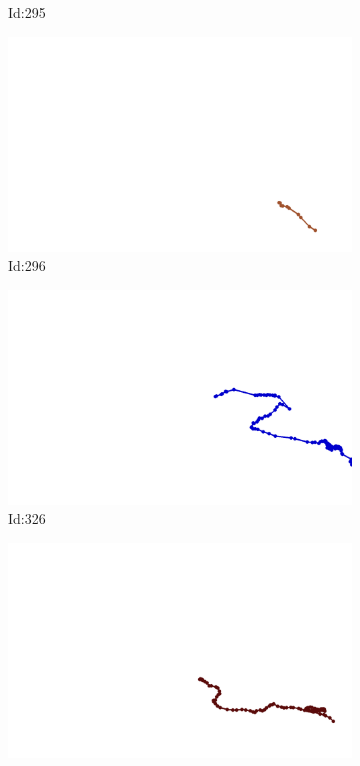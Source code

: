 \documentclass[12pt,twoside]{report}
\begin{document}
\begin{figure}
\begin{subfigure}[b]{0.20\textwidth}
\caption{Id:295}
\end{subfigure}
\begin{subfigure}[b]{0.20\textwidth}
\centering
\includegraphics[width=\textwidth]{../trajectories/296.png}
\caption{Id:296}
\end{subfigure}
\begin{subfigure}[b]{0.20\textwidth}
\centering
\includegraphics[width=\textwidth]{../trajectories/326.png}
\caption{Id:326}
\end{subfigure}
\begin{subfigure}[b]{0.20\textwidth}
\centering
\includegraphics[width=\textwidth]{../trajectories/460.png}

\end{subfigure}
\end{figure}
\end{document}
